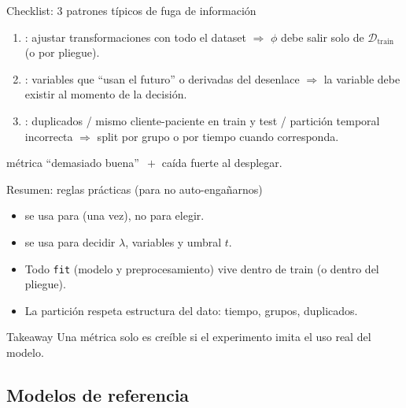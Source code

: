 \begin{frame}{Checklist: 3 patrones típicos de fuga de información}

\small
\begin{enumerate}\setlength{\itemsep}{0.5em}
  \item {}: ajustar transformaciones con todo el dataset
  \(\Rightarrow\) \(\phi\) debe salir solo de \(\mathcal{D}_{\text{train}}\) (o por pliegue).
  \item {}: variables que “usan el futuro” o derivadas del desenlace
  \(\Rightarrow\) la variable debe existir al momento de la decisión.
  \item {}: duplicados / mismo cliente-paciente en train y test / partición temporal incorrecta
  \(\Rightarrow\) split por grupo o por tiempo cuando corresponda.
\end{enumerate}

\vspace{0.4em}
 métrica “demasiado buena” \(\,+\) caída fuerte al desplegar.
\end{frame}

\begin{frame}{Resumen: reglas prácticas (para no auto-engañarnos)}

\small
\begin{itemize}\setlength{\itemsep}{0.5em}
  \item {} se usa para  (una vez), no para elegir.
  \item {} se usa para decidir \(\lambda\), variables y umbral \(t\).
  \item Todo \texttt{fit} (modelo y preprocesamiento) vive dentro de train (o dentro del pliegue).
  \item La partición respeta estructura del dato: tiempo, grupos, duplicados.
\end{itemize}

\begin{block}{Takeaway}
Una métrica solo es creíble si el experimento imita el uso real del modelo.
\end{block}
\end{frame}

\subsection{Modelos de referencia}


